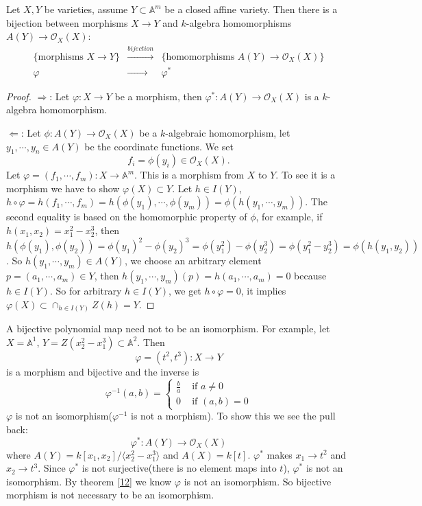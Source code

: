 \begin{theorem}\label{12}
	Let $ X,Y $ be varieties, assume $ Y\subset \mathbb{A}^m $ be a closed affine variety. Then there is a bijection between morphisms $ X\to Y $ and $ k $-algebra homomorphisms $ A(Y)\to \mathcal{O}_X(X) $:
	$$\begin{array}{ccc}
			\{ \text{morphisms } X\to Y \} & \xrightarrow{bijection}   & \{ \text{homomorphisms }A(Y)\to \mathcal{O}_X(X) \} \\
			\varphi                        & \xrightarrow{\qquad\quad} & \varphi^\ast
		\end{array}$$
\end{theorem}
\begin{proof}
	$ \Rightarrow $: Let $ \varphi :X\to Y $ be a morphism, then $ \varphi^\ast: A(Y)\to \mathcal{O}_X(X) $ is a $ k $-algebra homomorphism.

	$ \Leftarrow $: Let $\phi:A(Y)\to \mathcal{O}_X(X)  $ be a $ k $-algebraic homomorphism, let $ y_1,\cdots,y_n\in A(Y) $ be the coordinate functions. We set
	$$
		f_i=\phi(y_i)\in \mathcal{O}_X(X).
	$$
	Let $ \varphi=(f_1,\cdots,f_m):X\to \mathbb{A}^m $.
	This is a morphism from $ X $ to $ Y $. To see it is a morphism we have to show $ \varphi(X)\subset Y $. Let $ h\in I(Y) $, $ h\circ \varphi =h(f_1,\cdots,f_m)=h(\phi(y_1),\cdots,\phi(y_m))=\phi (h(y_1,\cdots,y_m)) $. The second equality is based on the homomorphic property of $ \phi $, for example, if $ h(x_1,x_2)=x_1^2-x_2^3 $, then $ h(\phi(y_1),\phi(y_2))=\phi(y_1)^2-\phi(y_2)^3= \phi(y_1^2)-\phi(y_2^3)=\phi(y_1^2-y_2^3)=\phi(h(y_1,y_2)) $. So $ h(y_1,\cdots,y_m)\in A(Y) $, we choose an arbitrary element $ p=(a_1,\cdots,a_m)\in Y $, then $ h(y_1,\cdots,y_m)(p)=h(a_1,\cdots,a_m)=0 $ because $ h\in I(Y) $. So for arbitrary $ h\in I(Y) $, we get $ h\circ\varphi=0 $, it implies $ \varphi(X)\subset \mathop{\cap}_{h\in I(Y)} Z(h)= Y $.
\end{proof}
\begin{example}
	A bijective polynomial map need not to be an isomorphism. For example, let$ X=\mathbb{A}^1 $, $ Y=Z(x_2^2-x_1^3) \subset \mathbb{A}^2 $. Then
	$$
		\varphi=(t^2,t^3):X\to Y
	$$
	is a morphism and bijective and the inverse is
	$$
		\varphi^{-1}(a,b)=\left\lbrace \begin{matrix}
			\frac{b}{a} & \text{ if } a\neq 0 \\
			0           & \text{ if } (a,b)=0
		\end{matrix}\right.
	$$
	$ \varphi $ is not an isomorphism($ \varphi^{-1} $ is not a morphism). To show this we see the pull back:
	$$
		\varphi^\ast : A(Y)\to \mathcal{O}_X(X)
	$$
	where $ A(Y)=k[x_1,x_2]/\langle x_2^2-x_1^3\rangle $ and $ A(X)=k[t] $. $ \varphi^\ast $ makes $ x_1\to t^2 $ and $ x_2\to t^3 $. Since $ \varphi^\ast $ is not surjective(there is no element maps into $ t $), $ \varphi^\ast $ is not an isomorphism. By theorem \ref{12} we know $ \varphi $ is not an isomorphism. So bijective morphism is not necessary to be an isomorphism.
\end{example}
